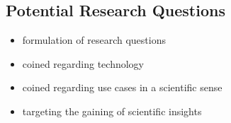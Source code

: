 \subsection{Potential Research Questions}

\begin{itemize}
    \item formulation of research questions 
    \item coined regarding technology
    \item coined regarding use cases in a scientific sense
    \item targeting the gaining of scientific insights
\end{itemize}

